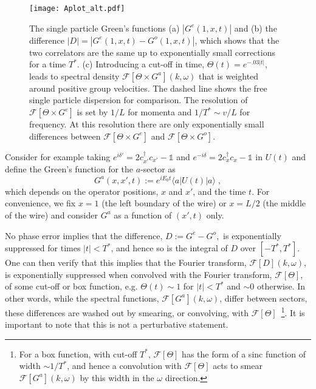 \documentclass[aps,pra,floatfix,footinbib,longbibliography,twocolumn,superscriptaddress, preprintnumbers, nobibnotes]{revtex4-1}
\begin{document}
\begin{figure*}
    \centering
    \texttt{[image: Aplot\_alt.pdf]}
    \caption{The single particle Green's functions (a) $|G^{e} (1,x,t)|$ and (b) the difference  $|D|=|G^{e}(1,x,t)-G^{o}(1,x,t)|$, which shows that the two correlators are the same up to exponentially small corrections for a time $T^*$. (c) Introducing a cut-off in time, $\Theta (t) =e^{- .03 |t|}$, leads to spectral density $\mathcal{F}[\Theta \times G^a](k,\omega)$ that is weighted around positive group velocities. The dashed line shows the free single particle dispersion for comparison. The resolution of $\mathcal{F}[\Theta \times G^e]$ is set by $1/L$ for momenta and $1/T^* \sim v/L$ for frequency. At this resolution there are only exponentially small differences between $\mathcal{F}[\Theta \times G^e]$ and $\mathcal{F}[\Theta \times G^o]$.}
    \label{fig:GF_res_fermion}
\end{figure*}

Consider for example taking $e^{i \delta'}= 2 c^\dagger_{x'}c_{x'} -\mathds{1}$ and $e^{-i \delta} = 2 c^\dagger_{x} c_{x}-\mathds{1}$ in $U(t)$ %
and define the Green's function for the $a$-sector as
\begin{equation}
    G^{a}(x,x',t) := e^{i E_0 t } \langle a | U(t) |a \rangle \; ,
\end{equation}
which depends on the operator positions, $x$ and $x'$, and the time $t$. For convenience, we fix $x=1$ (the left boundary of the wire) or $x=L/2$ (the middle of the wire) %
and consider $G^a$ as a function of $(x',t)$ only.

No phase error implies that the difference, $D := G^e - G^o,$ is exponentially suppressed for times $|t| < T^*$, and hence so is the integral of $D$ over $[-T^*, T^*]$. One can then verify that this implies that the Fourier transform, $\mathcal{F}[D](k,\omega)$, is exponentially suppressed when convolved with the Fourier transform, $\mathcal{F}[\Theta]$, of some cut-off or box function, e.g. $\Theta(t) \sim 1$ for $|t| < T^*$ and $\sim 0$ otherwise. In other words, while the spectral functions, $\mathcal{F}[G^a](k,\omega)$, differ between sectors, these differences are washed out by smearing, or convolving, with $\mathcal{F}[\Theta]$~\footnote{For a box function, with cut-off $T^{*}$, $\mathcal{F}[\Theta]$ has the form of a sinc function of width $\sim 1/T^*$, and hence a convolution with $\mathcal{F}[\Theta]$ acts to smear $\mathcal{F}[G^a](k,\omega)$ by this width in the $\omega$ direction.}. It is important to note that this is not a perturbative statement.
\end{document}
